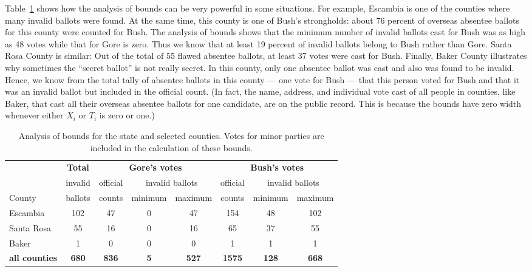 \documentclass[11pt,titlepage]{article}
\begin{document}
Table~\ref{tb:bounds} shows how the analysis of bounds can be very
powerful in some situations. For example, Escambia is one of the
counties where many invalid ballots were found. At the same time, this
county is one of Bush's strongholds: about 76 percent of overseas
absentee ballots for this county were counted for Bush. The analysis
of bounds shows that the minimum number of invalid ballots cast for
Bush was as high as 48 votes while that for Gore is zero. Thus we know
that at least 19 percent of invalid ballots belong to Bush rather than
Gore.  Santa Rosa County is similar: Out of the total of 55 flawed
absentee ballots, at least 37 votes were cast for Bush.  Finally,
Baker County illustrates why sometimes the ``secret ballot'' is not
really secret.  In this county, only one absentee ballot was cast and
also was found to be invalid. Hence, we know from the total tally of
absentee ballots in this county --- one vote for Bush --- that this
person voted for Bush and that it was an invalid ballot but included
in the official count.  (In fact, the name, address, and individual
vote cast of all people in counties, like Baker, that cast all their
overseas absentee ballots for one candidate, are on the public record.
This is because the bounds have zero width whenever either $X_i$ or
$T_i$ is zero or one.)
\begin{table}[t]
\begin{center}
\begin{tabular}{l c |ccc|ccc}
  & \bf Total   & \multicolumn{3}{c|}{\bf Gore's votes} &
  \multicolumn{3}{c}{\bf Bush's votes} \\
  & invalid & official & \multicolumn{2}{c|}{invalid ballots} & official &
  \multicolumn{2}{c}{invalid ballots} \\
County & ballots & counts & minimum & maximum & counts & minimum & maximum \\
\hline 
Escambia   & 102 & 47 & 0 & 47 & 154 & 48 & 102 \\
Santa Rosa &  55 & 16 & 0 & 16 &  65 & 37 &  55 \\
Baker      &   1 &  0 & 0 &  0 &   1 &  1 &   1 \\
\hline
\bf all counties & \bf 680 & \bf 836 & \bf 5 & \bf 527 & \bf 1575 & \bf 128 & \bf 668 \\ 
\end{tabular} \caption{Analysis of bounds for the state  and 
  selected counties.  Votes for minor parties are included in the
  calculation of these bounds.}\label{tb:bounds}
\end{center}
\end{table} 
\end{document}
